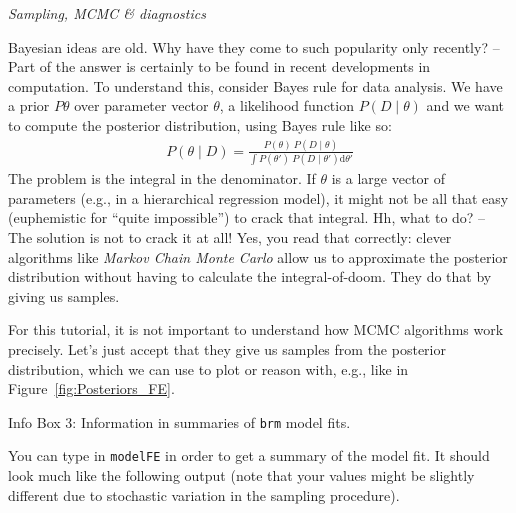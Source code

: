 \documentclass[nobib]{tufte-handout}
\begin{document}
\begin{InfoBox}[]
\centering
\colorbox{mygray}{\centering
  \begin{minipage}{1.0\textwidth}

    \emph{Sampling, MCMC \& diagnostics}
    \medskip

    Bayesian ideas are old. Why have they come to such popularity only recently? -- Part of the
    answer is certainly to be found in recent developments in computation. To understand this,
    consider Bayes rule for data analysis. We have a prior $P{\theta}$ over parameter vector
    $\theta$, a likelihood function $P(D \mid \theta)$ and we want to compute the posterior
    distribution, using Bayes rule like so:
    \begin{eqnarray*}
      P(\theta \mid D) = \frac{P(\theta) \ P(D \mid \theta)}{ \int P(\theta') \ P(D \mid
      \theta') \textrm{d}\theta'}
    \end{eqnarray*}
    The problem is the integral in the denominator. If $\theta$ is a large vector of parameters
    (e.g., in a hierarchical regression model), it might not be all that easy (euphemistic for
    ``quite impossible'') to crack that integral. Hh, what to do? -- The solution is not to
    crack it at all! Yes, you read that correctly: clever algorithms like \emph{Markov Chain
      Monte Carlo} allow us to approximate the posterior distribution without having to
    calculate the integral-of-doom. They do that by giving us samples.

    For this tutorial, it is not important to understand how MCMC algorithms work precisely.
    Let's just accept that they give us samples from the posterior distribution, which we can
    use to plot or reason with, e.g., like in Figure~\ref{fig:Posteriors_FE}.  
  \end{minipage} \par
  } \par
  \begin{center}
    Info Box 3: Information in summaries of \texttt{brm} model fits.
  \end{center}
\end{InfoBox}


You can type in \texttt{modelFE} in order to get a summary of the model fit. It should look much like the following output (note that your  values might be slightly different due to stochastic variation in the sampling procedure).

\medskip
\end{document}
